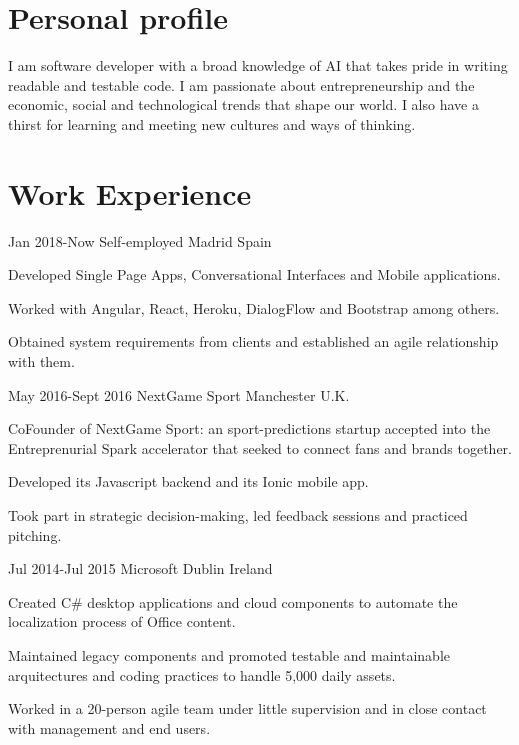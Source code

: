 \documentclass[10pt]{CurriculumVitae}
\begin{document}
  \makeheading


  \section{Personal profile}
    {
      I am software developer with a broad knowledge of AI that takes pride in writing readable and testable code.
      I am passionate about entrepreneurship and the economic, social and technological trends that shape our world.
      I also have a thirst for learning and meeting new cultures and ways of thinking. 
    }


  \section{Work Experience}
      {Jan 2018-Now}
      {Self-employed}
      {Madrid}
      {Spain}
      {
        \item Developed Single Page Apps, Conversational Interfaces and Mobile applications.
        \item Worked with Angular, React, Heroku, DialogFlow and Bootstrap among others.
        \item Obtained system requirements from clients and established an agile relationship with them.
      }
   
      {May 2016-Sept 2016}
      {NextGame Sport} 
      {Manchester}
      {U.K.}
      {
        \item CoFounder of NextGame Sport: an sport-predictions startup accepted into the
          Entreprenurial Spark accelerator that seeked to connect fans and brands together.
        \item Developed its Javascript backend and its Ionic mobile app.
        \item Took part in strategic decision-making, led feedback sessions and practiced pitching.
      }
  
      {Jul 2014-Jul 2015}
      {Microsoft} 
      {Dublin}
      {Ireland}
      {
         \item Created C\# desktop applications and cloud components to automate the localization
          process of Office content.
         \item Maintained legacy components and promoted testable and maintainable 
         arquitectures and coding practices to handle 5,000 daily assets.
         \item Worked in a 20-person agile team under little supervision and 
         in close contact with management and end users.
      }
    
\end{document}
